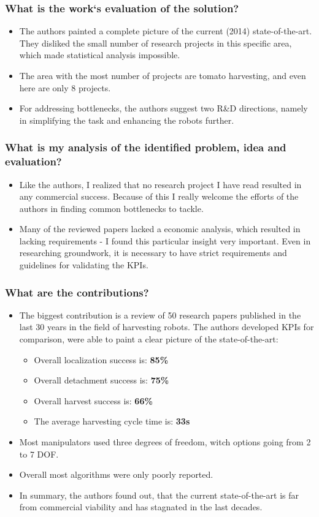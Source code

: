 \subsubsection*{What is the work`s evaluation of the solution?}
\begin{itemize}
    \item The authors painted a complete picture of the current (2014) state-of-the-art. They disliked the small number of research projects in this specific area, which made statistical analysis impossible.
    \item The area with the most number of projects are tomato harvesting, and even here are only 8 projects. 
    \item For addressing bottlenecks, the authors suggest two R\&D directions, namely in simplifying the task and enhancing the robots further.
\end{itemize}
\subsubsection*{What is my analysis of the identified problem, idea and evaluation?}
\begin{itemize}
    \item Like the authors, I realized that no research project I have read resulted in any commercial success. Because of this I really welcome the efforts of the authors in finding common bottlenecks to tackle. 
    \item Many of the reviewed papers lacked a economic analysis, which resulted in lacking requirements - I found this particular insight very important. Even in researching groundwork, it is necessary to have strict requirements and guidelines for validating the KPIs.
\end{itemize}
\subsubsection*{What are the contributions?}
\begin{itemize}
    \item The biggest contribution is a review of 50 research papers published in the last 30 years in the field of harvesting robots. The authors developed KPIs for comparison, were able to paint a clear picture of the state-of-the-art: \ \begin{itemize}
        \item Overall localization success is: \textbf{85\%}
        \item Overall detachment success is: \textbf{75\%}
        \item Overall harvest success is: \textbf{66\%}
        \item The average harvesting cycle time is: \textbf{33s}
    \end{itemize}
    \item Most manipulators used three degrees of freedom, witch options going from 2 to 7 DOF.
    \item Overall most algorithms were only poorly reported.
    \item In summary, the authors found out, that the current state-of-the-art is far from commercial viability and has stagnated in the last decades. 
\end{itemize}
